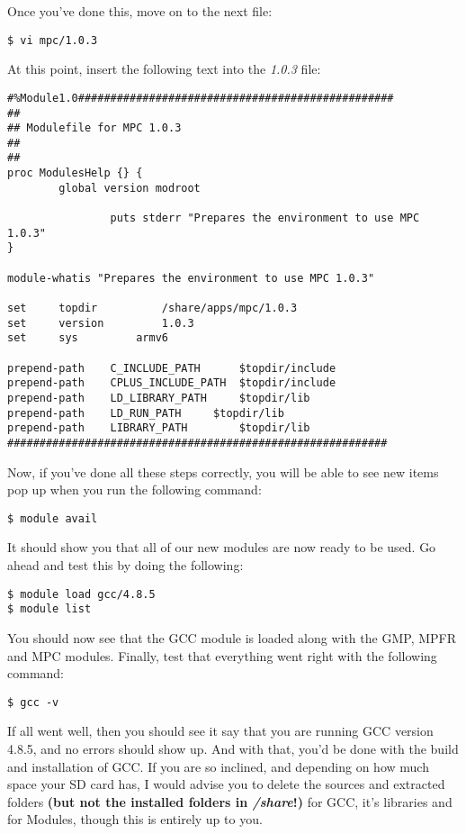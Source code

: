 \documentclass[]{article}
\begin{document}
Once you've done this, move on to the next file:
\begin{lstlisting}
$ vi mpc/1.0.3
\end{lstlisting}
At this point, insert the following text into the \textit{1.0.3} file:
\begin{lstlisting}
#%Module1.0#################################################
##
## Modulefile for MPC 1.0.3
##
##
proc ModulesHelp {} {
        global version modroot
                
                puts stderr "Prepares the environment to use MPC 1.0.3"
}

module-whatis "Prepares the environment to use MPC 1.0.3"

set     topdir          /share/apps/mpc/1.0.3
set     version         1.0.3
set     sys         armv6

prepend-path    C_INCLUDE_PATH      $topdir/include
prepend-path    CPLUS_INCLUDE_PATH  $topdir/include
prepend-path    LD_LIBRARY_PATH     $topdir/lib
prepend-path    LD_RUN_PATH     $topdir/lib
prepend-path    LIBRARY_PATH        $topdir/lib
###########################################################
\end{lstlisting}
Now, if you've done all these steps correctly, you will be able to see new items pop up when you run the following command:
\begin{lstlisting}
$ module avail
\end{lstlisting}
It should show you that all of our new modules are now ready to be used. Go ahead and test this by doing the following:
\begin{lstlisting}
$ module load gcc/4.8.5
$ module list
\end{lstlisting}
You should now see that the GCC module is loaded along with the GMP, MPFR and MPC modules. Finally, test that everything went right with
the following command:
\begin{lstlisting}
$ gcc -v
\end{lstlisting}
If all went well, then you should see it say that you are running GCC version 4.8.5, and no errors should show up. And with that, you'd
be done with the build and installation of GCC. If you are so inclined, and depending on how much space your SD card has, I would advise
you to delete the sources and extracted folders \textbf{(but not the installed folders in \textit{/share}!)} for GCC, it's libraries and 
for Modules, though this is entirely up to you.
\end{document}
